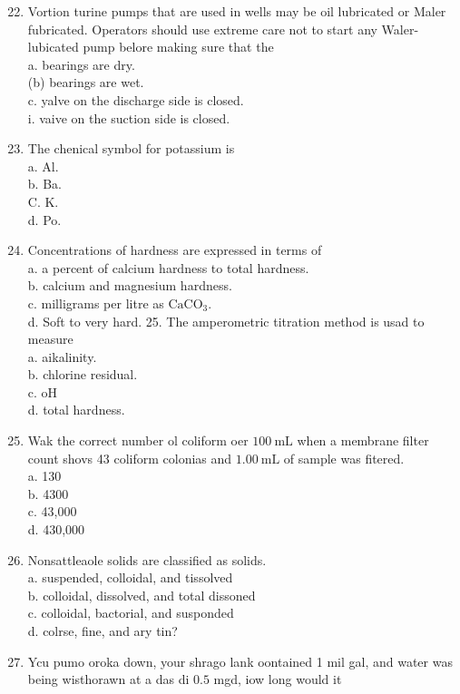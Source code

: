 \documentclass[10pt]{article}
\begin{document}
\begin{enumerate}
  \setcounter{enumi}{21}
  \item Vortion turine pumps that are used in wells may be oil lubricated or Maler fubricated. Operators should use extreme care not to start any Waler-lubicated pump belore making sure that the\\
a. bearings are dry.\\
(b) bearings are wet.\\
c. yalve on the discharge side is closed.\\
i. vaive on the suction side is closed.

  \item The chenical symbol for potassium is\\
a. Al.\\
b. Ba.\\
C. K.\\
d. Po.

  \item Concentrations of hardness are expressed in terms of\\
a. a percent of calcium hardness to total hardness.\\
b. calcium and magnesium hardness.\\
c. milligrams per litre as $\mathrm{CaCO}_{3}$.\\
d. Soft to very hard. 25. The amperometric titration method is usad to measure\\
a. aikalinity.\\
b. chlorine residual.\\
c. $\mathrm{oH}$\\
d. total hardness.

  \item Wak the correct number ol coliform oer $100 \mathrm{~mL}$ when a membrane filter count shovs 43 coliform colonias and $1.00 \mathrm{~mL}$ of sample was fitered.\\
a. 130\\
b. 4300\\
c. 43,000\\
d. 430,000

  \item Nonsattleaole solids are classified as solids.\\
a. suspended, colloidal, and tissolved\\
b. colloidal, dissolved, and total dissoned\\
c. colloidal, bactorial, and susponded\\
d. colrse, fine, and ary tin?

  \item Ycu pumo oroka down, your shrago lank oontained 1 mil gal, and water was being wisthorawn at a das di $0.5$ mgd, iow long would it

\end{enumerate}
\end{document}
